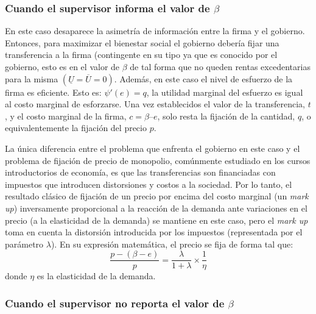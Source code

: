 \documentclass[
  12pt,
  spanish,
]{book}
\begin{document}
\hypertarget{cuando-el-supervisor-informa-el-valor-de-beta}{%
\subsubsection{\texorpdfstring{Cuando el supervisor informa el valor de \(\beta\)}{Cuando el supervisor informa el valor de \textbackslash beta}}\label{cuando-el-supervisor-informa-el-valor-de-beta}}

En este caso desaparece la asimetría de información entre la firma y el gobierno. Entonces, para maximizar el bienestar social el gobierno debería fijar una transferencia a la firma (contingente en su tipo ya que es conocido por el gobierno, esto es en el valor de \(β\) de tal forma que no queden rentas excedentarias para la misma \((\underline U = \overline U=0)\). Además, en este caso el nivel de esfuerzo de la firma es eficiente. Esto es: \(ψ′(e) = q\), la utilidad marginal del esfuerzo es igual al costo marginal de esforzarse. Una vez establecidos el valor de la transferencia, \(t\), y el costo marginal de la firma, \(c = β – e\), solo resta la fijación de la cantidad, \(q\), o equivalentemente la fijación del precio \(p\).

La única diferencia entre el problema que enfrenta el gobierno en este caso y el problema de fijación de precio de monopolio, comúnmente estudiado en los cursos introductorios de economía, es que las transferencias son financiadas con impuestos que introducen distorsiones y costos a la sociedad. Por lo tanto, el resultado clásico de fijación de un precio por encima del costo marginal (un \emph{mark up}) inversamente proporcional a la reacción de la demanda ante variaciones en el precio (a la elasticidad de la demanda) se mantiene en este caso, pero el \emph{mark up} toma en cuenta la distorsión introducida por los impuestos (representada por el parámetro \(λ\)). En su expresión matemática, el precio se fija de forma tal que:
\[\frac{p-\left(\beta-e\right)}{p}=\frac{\lambda}{1+\lambda}\times\frac{1}{\eta}\]
donde \(η\) es la elasticidad de la demanda.

\hypertarget{cuando-el-supervisor-no-reporta-el-valor-de-ux3b2}{%
\subsubsection{\texorpdfstring{Cuando el supervisor no reporta el valor de \(β\)}{Cuando el supervisor no reporta el valor de β}}\label{cuando-el-supervisor-no-reporta-el-valor-de-ux3b2}}
\end{document}
